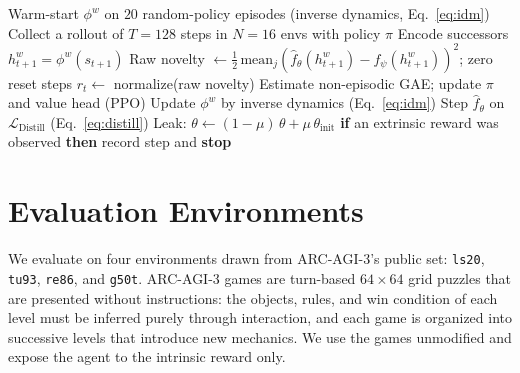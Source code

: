 \documentclass{article}
\begin{document}
\begin{algorithm}[H]
\caption{Leaky RND training loop (one level)}
\label{alg:leakyrnd}
\begin{algorithmic}[1]
\State Warm-start $\phi^w$ on $20$ random-policy episodes (inverse dynamics, Eq.~\ref{eq:idm})
  \State Collect a rollout of $T{=}128$ steps in $N{=}16$ envs with policy $\pi$
  \State Encode successors $h^w_{t+1} = \phi^w(s_{t+1})$
  \State Raw novelty $\leftarrow \tfrac{1}{2}\,\text{mean}_j(\hat f_\theta(h^w_{t+1})-f_\psi(h^w_{t+1}))^2$; zero reset steps
  \State $r_t \leftarrow$ normalize(raw novelty) 
  \State Estimate non-episodic GAE; update $\pi$ and value head (PPO)
  \State Update $\phi^w$ by inverse dynamics (Eq.~\ref{eq:idm}) 
    \State Step $\hat f_\theta$ on $\mathcal{L}_{\text{Distill}}$ (Eq.~\ref{eq:distill})
    \State Leak: $\theta \leftarrow (1-\mu)\,\theta + \mu\,\theta_{\text{init}}$ 
  \EndFor
  \State \textbf{if} an extrinsic reward was observed \textbf{then} record step and \textbf{stop}
\EndFor
\end{algorithmic}
\end{algorithm}

\section{Evaluation Environments}
\label{app:envs}

We evaluate on four environments drawn from ARC-AGI-3's public set:
\texttt{ls20}, \texttt{tu93}, \texttt{re86}, and \texttt{g50t}. ARC-AGI-3 games
are turn-based $64\times64$ grid puzzles that are presented without
instructions: the objects, rules, and win condition of each level must be
inferred purely through interaction, and each game is organized into successive
levels that introduce new mechanics. We use the games unmodified and expose the
agent to the intrinsic reward only.
\end{document}
